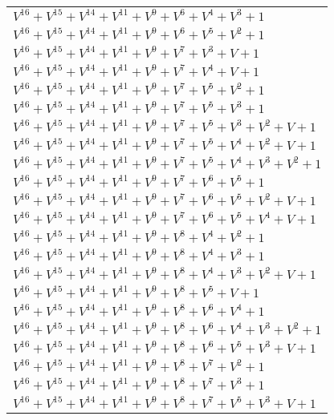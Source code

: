 \documentclass[12pt]{article}
\begin{document}
\begin{adjustwidth}{-4cm}{}
\begin{center}
\begin{longtable}{|l|}
$V^{16}  +V^{15}  +V^{14}  +V^{11}  +V^{9}  +V^{6}  +V^{4}  +V^{3}  + 1$ \\
$V^{16}  +V^{15}  +V^{14}  +V^{11}  +V^{9}  +V^{6}  +V^{5}  +V^{2}  + 1$ \\
$V^{16}  +V^{15}  +V^{14}  +V^{11}  +V^{9}  +V^{7}  +V^{3}  + V + 1$ \\
$V^{16}  +V^{15}  +V^{14}  +V^{11}  +V^{9}  +V^{7}  +V^{4}  + V + 1$ \\
$V^{16}  +V^{15}  +V^{14}  +V^{11}  +V^{9}  +V^{7}  +V^{5}  +V^{2}  + 1$ \\
$V^{16}  +V^{15}  +V^{14}  +V^{11}  +V^{9}  +V^{7}  +V^{5}  +V^{3}  + 1$ \\
$V^{16}  +V^{15}  +V^{14}  +V^{11}  +V^{9}  +V^{7}  +V^{5}  +V^{3}  +V^{2}  + V + 1$ \\
$V^{16}  +V^{15}  +V^{14}  +V^{11}  +V^{9}  +V^{7}  +V^{5}  +V^{4}  +V^{2}  + V + 1$ \\
$V^{16}  +V^{15}  +V^{14}  +V^{11}  +V^{9}  +V^{7}  +V^{5}  +V^{4}  +V^{3}  +V^{2}  + 1$ \\
$V^{16}  +V^{15}  +V^{14}  +V^{11}  +V^{9}  +V^{7}  +V^{6}  +V^{5}  + 1$ \\
$V^{16}  +V^{15}  +V^{14}  +V^{11}  +V^{9}  +V^{7}  +V^{6}  +V^{5}  +V^{2}  + V + 1$ \\
$V^{16}  +V^{15}  +V^{14}  +V^{11}  +V^{9}  +V^{7}  +V^{6}  +V^{5}  +V^{4}  + V + 1$ \\
$V^{16}  +V^{15}  +V^{14}  +V^{11}  +V^{9}  +V^{8}  +V^{4}  +V^{2}  + 1$ \\
$V^{16}  +V^{15}  +V^{14}  +V^{11}  +V^{9}  +V^{8}  +V^{4}  +V^{3}  + 1$ \\
$V^{16}  +V^{15}  +V^{14}  +V^{11}  +V^{9}  +V^{8}  +V^{4}  +V^{3}  +V^{2}  + V + 1$ \\
$V^{16}  +V^{15}  +V^{14}  +V^{11}  +V^{9}  +V^{8}  +V^{5}  + V + 1$ \\
$V^{16}  +V^{15}  +V^{14}  +V^{11}  +V^{9}  +V^{8}  +V^{6}  +V^{4}  + 1$ \\
$V^{16}  +V^{15}  +V^{14}  +V^{11}  +V^{9}  +V^{8}  +V^{6}  +V^{4}  +V^{3}  +V^{2}  + 1$ \\
$V^{16}  +V^{15}  +V^{14}  +V^{11}  +V^{9}  +V^{8}  +V^{6}  +V^{5}  +V^{3}  + V + 1$ \\
$V^{16}  +V^{15}  +V^{14}  +V^{11}  +V^{9}  +V^{8}  +V^{7}  +V^{2}  + 1$ \\
$V^{16}  +V^{15}  +V^{14}  +V^{11}  +V^{9}  +V^{8}  +V^{7}  +V^{3}  + 1$ \\
$V^{16}  +V^{15}  +V^{14}  +V^{11}  +V^{9}  +V^{8}  +V^{7}  +V^{5}  +V^{3}  + V + 1$ \\

\end{longtable}
\end{center}
\end{adjustwidth}
\end{document}
